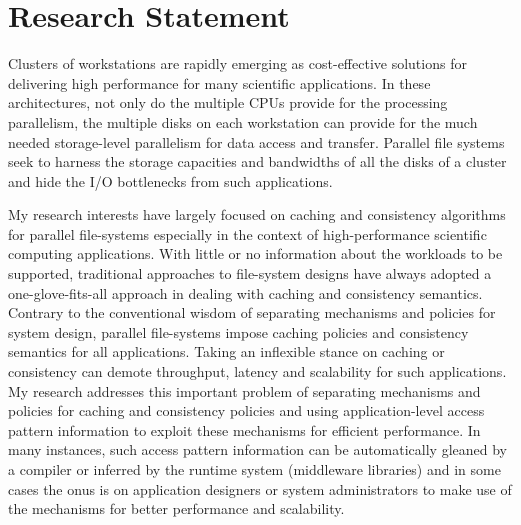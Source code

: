 \documentclass[11pt]{article}
\begin{document}
\section*{Research Statement}
Clusters of workstations are rapidly emerging as cost-effective solutions for 
delivering high performance for many scientific applications. In these 
architectures, not only do the multiple CPUs provide for the processing 
parallelism, the multiple disks on each workstation can provide for the much 
needed storage-level parallelism for data access and transfer. Parallel file 
systems seek to harness the storage capacities and bandwidths of all the disks of a cluster 
and hide the I/O bottlenecks from such applications. 

My research interests have largely focused on caching and consistency
algorithms for parallel file-systems especially in the context of high-performance
scientific computing applications. With little or no information about the workloads to be supported,
traditional approaches to file-system designs have always adopted
a one-glove-fits-all approach in dealing with caching and consistency semantics.
Contrary to the conventional wisdom of separating mechanisms and policies for system
design, parallel file-systems impose caching policies and consistency semantics for all applications. 
Taking an inflexible stance on caching or consistency can demote throughput, latency and scalability
for such applications. My research addresses this important
problem of separating mechanisms and policies for caching and consistency policies
and using application-level access pattern information to exploit these mechanisms for efficient
performance. In many instances, such access pattern information can be automatically
gleaned by a compiler or inferred by the runtime system (middleware libraries) and in some
cases the onus is on application designers or system administrators to make use
of the mechanisms for better performance and scalability. 
\end{document}
